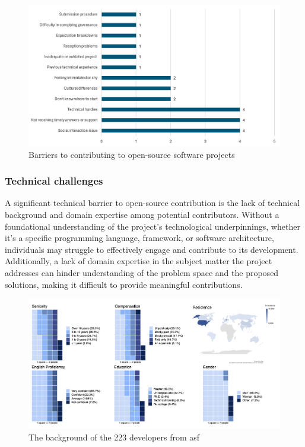 \begin{figure}[ht]
    \centering
    \includegraphics[width=1\linewidth]{figs/barriers.png}
    \caption{Barriers to contributing to open-source software projects}
    \label{fig:barriers}
\end{figure}



\subsubsection{Technical challenges}

A significant technical barrier to open-source contribution is the lack of technical background and domain expertise among potential contributors. Without a foundational understanding of the project's technological underpinnings, whether it's a specific programming language, framework, or software architecture, individuals may struggle to effectively engage and contribute to its development. Additionally, a lack of domain expertise in the subject matter the project addresses can hinder understanding of the problem space and the proposed solutions, making it difficult to provide meaningful contributions.

\begin{figure}[ht]
    \centering
    \includegraphics[width=1\linewidth]{figs/contributor_background.png}
    \caption{The background of the 223 developers from \ac{asf} \cite{04guizani2021long}}
    \label{fig:contributor_background}
\end{figure}

